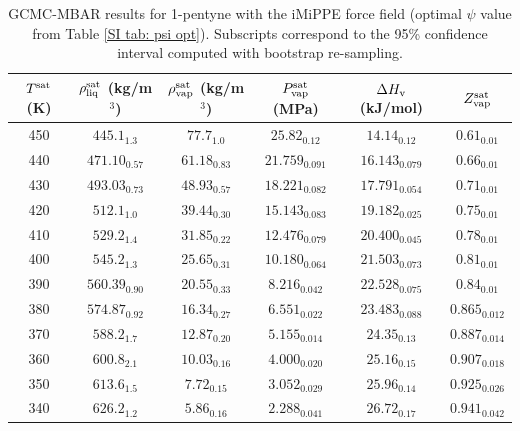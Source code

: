 \documentclass[journal=jctc,manuscript=article]{achemso}
\begin{document}
\begin{table}[htb!]
	\caption{GCMC-MBAR results for 1-pentyne with the iMiPPE force field (optimal $\psi$ value from Table \ref{SI tab: psi opt}). Subscripts correspond to the 95\% confidence interval computed with bootstrap re-sampling.}
	\begin{center}
		\begin{tabular}{|c|c|c|c|c|c|}
			\hline
			$T^{\rm sat}$ (K) & $\rho_{\rm liq}^{\rm sat}$ (kg/m$^3$) & $\rho_{\rm vap}^{\rm sat}$ (kg/m$^3$) & $P_{\rm vap}^{\rm sat}$ (MPa) & $\Delta H_{\rm v}$ (kJ/mol) & $Z_{\rm vap}^{\rm sat}$ \\ \hline
			450 & $445.1_{1.3}$ & $77.7_{1.0}$ & $25.82_{0.12}$ & $14.14_{0.12}$ & $0.61_{0.01}$ \\
			440 & $471.10_{0.57}$ & $61.18_{0.83}$ & $21.759_{0.091}$ & $16.143_{0.079}$ & $0.66_{0.01}$ \\
			430 & $493.03_{0.73}$ & $48.93_{0.57}$ & $18.221_{0.082}$ & $17.791_{0.054}$ & $0.71_{0.01}$ \\
			420 & $512.1_{1.0}$ & $39.44_{0.30}$ & $15.143_{0.083}$ & $19.182_{0.025}$ & $0.75_{0.01}$ \\
			410 & $529.2_{1.4}$ & $31.85_{0.22}$ & $12.476_{0.079}$ & $20.400_{0.045}$ & $0.78_{0.01}$ \\
			400 & $545.2_{1.3}$ & $25.65_{0.31}$ & $10.180_{0.064}$ & $21.503_{0.073}$ & $0.81_{0.01}$ \\
			390 & $560.39_{0.90}$ & $20.55_{0.33}$ & $8.216_{0.042}$ & $22.528_{0.075}$ & $0.84_{0.01}$ \\
			380 & $574.87_{0.92}$ & $16.34_{0.27}$ & $6.551_{0.022}$ & $23.483_{0.088}$ & $0.865_{0.012}$ \\
			370 & $588.2_{1.7}$ & $12.87_{0.20}$ & $5.155_{0.014}$ & $24.35_{0.13}$ & $0.887_{0.014}$ \\
			360 & $600.8_{2.1}$ & $10.03_{0.16}$ & $4.000_{0.020}$ & $25.16_{0.15}$ & $0.907_{0.018}$ \\
			350 & $613.6_{1.5}$ & $7.72_{0.15}$ & $3.052_{0.029}$ & $25.96_{0.14}$ & $0.925_{0.026}$ \\
			340 & $626.2_{1.2}$ & $5.86_{0.16}$ & $2.288_{0.041}$ & $26.72_{0.17}$ & $0.941_{0.042}$ \\
			\hline
		\end{tabular}
	\end{center}
\end{table}
\end{document}
